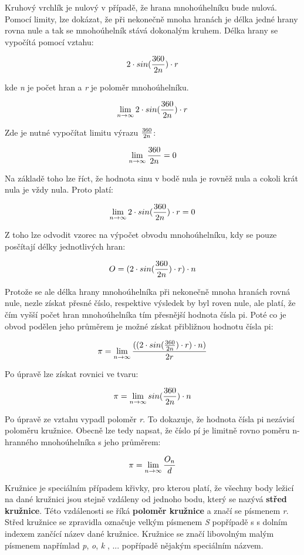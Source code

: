 \vskip 4mm
\centerline{}
\vskip 4mm

Kruhový vrchlík je nulový v případě, že hrana mnohoúhelníku bude nulová. Pomocí limity, lze dokázat, že při nekonečně mnoha hranách je délka jedné hrany rovna nule a tak se mnohoúhelník stává dokonalým kruhem. Délka hrany se vypočítá pomocí vztahu:

$$ 2\cdot sin({360\over 2n}) \cdot r $$

kde {\it n} je počet hran a {\it r} je poloměr mnohoúhelníku.

$$ \lim_{n\rightarrow \infty} {2\cdot sin({360\over 2n}) \cdot r} $$


Zde je nutné vypočítat limitu výrazu $360\over 2n$:

$$ \lim_{n \rightarrow \infty} {360\over 2n} = 0 $$


Na základě toho lze říct, že hodnota sinu v bodě nula je rovněž nula a cokoli krát nula je vždy nula. Proto platí:

$$ \lim_{n\rightarrow \infty} {2\cdot sin({360\over 2n}) \cdot r}  = 0$$

Z toho lze odvodit vzorec na výpočet obvodu mnohoúhelníku, kdy se pouze posčítají délky jednotlivých hran:

$$ O = (2\cdot sin({360\over 2n}) \cdot r)\cdot n $$

Protože se ale délka hrany mnohoúhelníka při nekonečně mnoha hranách rovná nule, nezle získat přesné číslo, respektive výsledek by byl roven nule, ale platí, že čím vyšší počet hran mnohoúhelníka tím přesnější hodnota čísla pi. Poté co je obvod podělen jeho průměrem je možné získat přibližnou hodnotu čísla pi:

$$ \pi = \lim_{n\rightarrow \infty} {((2\cdot sin({360\over 2n}) \cdot r)\cdot n) \over 2r} $$

Po úpravě lze získat rovnici ve tvaru:

$$ \pi = \lim_{n \rightarrow \infty} {sin({360\over 2n}) \cdot n} $$

Po úpravě ze vztahu vypadl poloměr {\it r}. To dokazuje, že hodnota čísla pi nezávisí poloměru kružnice. Obecně lze tedy napsat, že číslo pí je limitně rovno poměru n-hranného mnohoúhelníka s jeho průměrem:

$$ \pi = \lim_{n\rightarrow \infty} {O_n \over d }$$


Kružnice je speciálním případem křivky, pro kterou platí, že všechny body ležicí na dané kružnici jsou stejně vzdáleny od jednoho bodu, který se nazývá {\bf střed kružnice}. Této vzdálenosti se říká {\bf poloměr kružnice} a značí se písmenem {\it r}. Střed kružnice se zpravidla označuje velkým písmenem {\it S} popřípadě s s dolním indexem zančící název dané kružnice. Kružnice se značí libovolným malým písmenem napřímlad {\it p}, {\it o}, {\it k }, ... popřípadě nějakým speciálním názvem.

